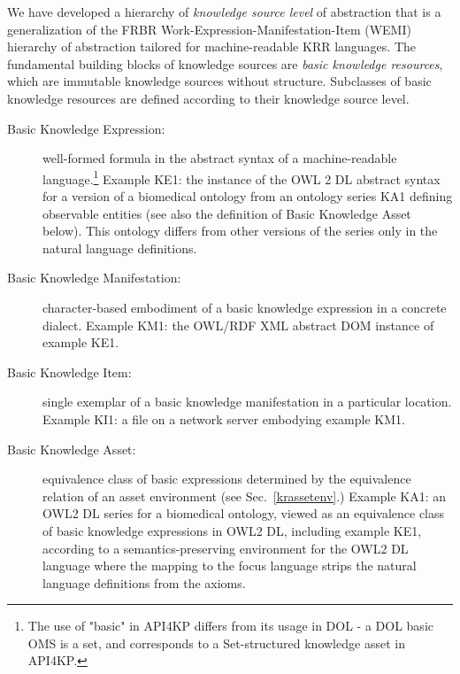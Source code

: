 \documentclass[runningheads]{llncs}
\begin{document}
We have developed a hierarchy of \emph{knowledge source level} of abstraction that is a generalization of the FRBR \cite{FRBR} Work-Expression-Manifestation-Item (WEMI) hierarchy of abstraction tailored for machine-readable KRR languages. The fundamental building blocks of knowledge sources are \emph{basic knowledge resources}, which are immutable knowledge sources without structure.
Subclasses of basic knowledge resources are defined according to their knowledge source level. 
\begin{description}
\item[Basic Knowledge Expression:] well-formed formula in the abstract syntax of a machine-readable language.\footnote{The use of "basic" in API4KP differs from its usage in DOL - a DOL basic OMS is a set, and corresponds to a Set-structured knowledge asset in API4KP.}
Example KE1: the instance of the OWL 2 DL abstract syntax for a version of a biomedical ontology from an ontology series KA1 
defining observable entities
(see also the definition of Basic Knowledge Asset below). 
This ontology differs from other versions of the series only in the natural language definitions.
\item[Basic Knowledge Manifestation:] character-based embodiment of a basic knowledge expression in a concrete dialect. Example KM1: the OWL/RDF XML abstract DOM instance of example KE1.
\item[Basic Knowledge Item:] single exemplar of a basic knowledge manifestation in a particular location. Example KI1: a file on a network server embodying example KM1.
\item[Basic Knowledge Asset:] equivalence class of basic expressions determined by the equivalence relation of an asset environment (see Sec.~\ref{krassetenv}.) Example KA1: an OWL2 DL series for a biomedical ontology, viewed as an equivalence class of basic knowledge expressions in OWL2 DL, including example KE1, according to a semantics-preserving environment for the OWL2 DL language where the mapping to the focus language strips the natural language definitions from the axioms.
\end{description}
\end{document}
